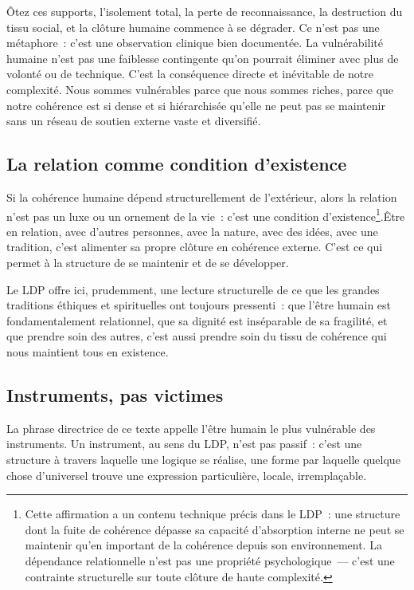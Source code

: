 \documentclass[12pt, a4paper, openright]{book}
\begin{document}
\medskip

Ôtez ces supports, l'isolement total, la perte de reconnaissance, la destruction du tissu social, et la clôture humaine commence à se dégrader. Ce n'est pas une métaphore~: c'est une observation clinique bien documentée. La vulnérabilité humaine n'est pas une faiblesse contingente qu'on pourrait éliminer avec plus de volonté ou de technique. C'est la conséquence directe et inévitable de notre complexité. Nous sommes vulnérables parce que nous sommes riches, parce que notre cohérence est si dense et si hiérarchisée qu'elle ne peut pas se maintenir sans un réseau de soutien externe vaste et diversifié.

\subsection*{La relation comme condition d'existence}

Si la cohérence humaine dépend structurellement de l'extérieur, alors la relation n'est pas un luxe ou un ornement de la vie~: c'est une condition d'existence\footnote{Cette affirmation a un contenu technique précis dans le LDP~: une structure dont la fuite de cohérence dépasse sa capacité d'absorption interne ne peut se maintenir qu'en important de la cohérence depuis son environnement. La dépendance relationnelle n'est pas une propriété psychologique~--- c'est une contrainte structurelle sur toute clôture de haute complexité.}.Être en relation, avec d'autres personnes, avec la nature, avec des idées, avec une tradition, c'est alimenter sa propre clôture en cohérence externe. C'est ce qui permet à la structure de se maintenir et de se développer.

\medskip

Le LDP offre ici, prudemment, une lecture structurelle de ce que les grandes traditions éthiques et spirituelles ont toujours pressenti~: que l'être humain est fondamentalement relationnel, que sa dignité est inséparable de sa fragilité, et que prendre soin des autres, c'est aussi prendre soin du tissu de cohérence qui nous maintient tous en existence.

\subsection*{Instruments, pas victimes}

La phrase directrice de ce texte appelle l'être humain \og le plus vulnérable des instruments\fg{}. Un instrument, au sens du LDP, n'est pas passif~: c'est une structure à travers laquelle une logique se réalise, une forme par laquelle quelque chose d'universel trouve une expression particulière, locale, irremplaçable.
\end{document}
